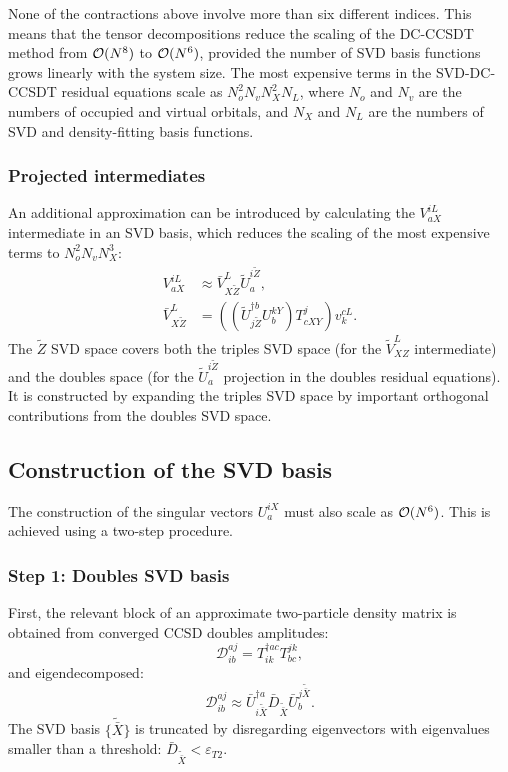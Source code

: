 \documentclass[a4paper,12pt,oneside]{book}
\begin{document}
None of the contractions above involve more than six different indices.
This means that the tensor decompositions reduce the scaling of the DC-CCSDT method 
from ${\cal O}(N^8)$ to ${\cal O}(N^6)$, provided the number of SVD basis functions 
grows linearly with the system size.
The most expensive terms in the SVD-DC-CCSDT residual equations scale as $N_o^2 N_v N_X^2 N_L$,
where $N_o$ and $N_v$ are the numbers of occupied and virtual orbitals,
and $N_X$ and $N_L$ are the numbers of SVD and density-fitting basis functions.

\subsubsection{Projected intermediates}

An additional approximation can be introduced by calculating the $V_{aX}^{iL}$ intermediate 
in an SVD basis, which reduces the scaling of the most expensive terms to $N_o^2 N_v N_X^3$:
\begin{equation}
\begin{aligned}
  V_{aX}^{iL} &\approx \bar V_{X\tilde Z}^{L} \tilde U^{i\tilde Z}_{a},\\
  \bar V_{X\tilde Z}^{L} &= \left(\left(\tilde U^{\dagger b}_{j\tilde Z} U^{kY}_{b} \right) T^{j}_{cXY}\right) v_k^{cL}.
\end{aligned}
\end{equation}
The $\tilde Z$ SVD space covers both the triples SVD space (for the $\tilde V_{XZ}^L$ intermediate)
and the doubles space (for the $\tilde U^{i\tilde Z}_a$ projection in the doubles residual equations).
It is constructed by expanding the triples SVD space by important orthogonal contributions 
from the doubles SVD space.


\subsection{Construction of the SVD basis}
\label{sec:svd_basis}

The construction of the singular vectors $U^{iX}_{a}$ must also scale as ${\cal O}(N^6)$.
This is achieved using a two-step procedure.

\subsubsection{Step 1: Doubles SVD basis}

First, the relevant block of an approximate two-particle density matrix is obtained from 
converged CCSD doubles amplitudes:
\begin{equation}
\mathcal{D}^{aj}_{ib} = T^{\dagger ac}_{ik} T^{jk}_{bc},
\end{equation}
and eigendecomposed:
\begin{equation}
\mathcal{D}^{aj}_{ib} \approx \bar{U}_{i\tilde{\bar X}}^{\dagger a} \bar{D}_{\tilde{\bar X}}
\bar{U}^{j\tilde{\bar X}}_{b}.
\end{equation}
The SVD basis $\{\tilde{\bar X}\}$ is truncated by disregarding eigenvectors 
with eigenvalues smaller than a threshold: $\bar{D}_{\tilde{\bar X}} \lt \varepsilon_{T2}$.
\end{document}
